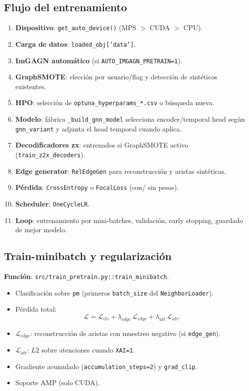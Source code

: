 \subsection{Flujo del entrenamiento}
\begin{enumerate}[leftmargin=*]
  \item \textbf{Dispositivo}: \texttt{get\_auto\_device()} (MPS $>$ CUDA $>$ CPU).
  \item \textbf{Carga de datos}: \texttt{loaded\_obj['data']}.
  \item \textbf{ImGAGN autom\'atico} (si \texttt{AUTO\_IMGAGN\_PRETRAIN=1}).
  \item \textbf{GraphSMOTE}: elecci\'on por usuario/flag y detecci\'on de sint\'eticos existentes.
  \item \textbf{HPO}: selecci\'on de \texttt{optuna\_hyperparams\_*.csv} o b\'usqueda nueva.
  \item \textbf{Modelo}: f\'abrica \texttt{\_build\_gnn\_model} selecciona encoder/temporal head seg\'un \texttt{gnn\_variant} y adjunta el head temporal cuando aplica.
  \item \textbf{Decodificadores z\textrightarrow x}: entrenados si GraphSMOTE activo (\texttt{train\_z2x\_decoders}).
  \item \textbf{Edge generator}: \texttt{RelEdgeGen} para reconstrucci\'on y aristas sint\'eticas.
  \item \textbf{P\'erdida}: \texttt{CrossEntropy} o \texttt{FocalLoss} (con/ sin pesos).
  \item \textbf{Scheduler}: \texttt{OneCycleLR}.
  \item \textbf{Loop}: entrenamiento por mini-batches, validaci\'on, early stopping, guardado de mejor modelo.
\end{enumerate}

\subsection{Train-minibatch y regularizaci\'on}
\textbf{Funci\'on}: \texttt{src/train\_pretrain.py::train\_minibatch}.
\begin{itemize}[leftmargin=*]
  \item Clasificaci\'on sobre \texttt{pm} (primeros \texttt{batch\_size} del \texttt{NeighborLoader}).
  \item P\'erdida total:
  \[
  \mathcal{L} = \mathcal{L}_{cls} + \lambda_{edge}\,\mathcal{L}_{edge} + \lambda_{att}\,\mathcal{L}_{att}.
  \]
  \item \textbf{\(\mathcal{L}_{edge}\)}: reconstrucci\'on de aristas con muestreo negativo (si \texttt{edge\_gen}).
  \item \textbf{\(\mathcal{L}_{att}\)}: $L2$ sobre atenciones cuando \texttt{XAI=1}.
  \item Gradiente acumulado (\texttt{accumulation\_steps=2}) y \texttt{grad\_clip}.
  \item Soporte AMP (solo CUDA).
\end{itemize}

